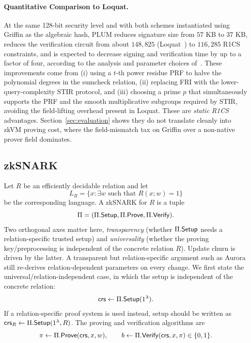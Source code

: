 \paragraph{Quantitative Comparison to Loquat.}
At the same 128-bit security level and with both schemes instantiated using Griffin as the algebraic hash, PLUM reduces signature size from \(57\) KB to \(37\) KB, reduces the verification circuit from about \(148{,}825\) (Loquat~\cite{cryptoeprint:2024/868}) to \(116{,}285\) R1CS constraints, and is expected to decrease signing and verification time by up to a factor of four, according to the analysis and parameter choices of~\cite{10.1007/978-981-95-2961-2_6}.
These improvements come from (i) using a \(t\)-th power residue PRF to halve the polynomial degrees in the sumcheck relation, (ii) replacing FRI with the lower-query-complexity STIR protocol, and (iii) choosing a prime \(p\) that simultaneously supports the PRF and the smooth multiplicative subgroups required by STIR, avoiding the field-lifting overhead present in Loquat. These are \emph{static R1CS} advantages. Section~\ref{sec:evaluation} shows they do not translate cleanly into zkVM proving cost, where the field-mismatch tax on Griffin over a non-native prover field dominates.

\subsection{zkSNARK}
Let $R$ be an efficiently decidable relation and let
\begin{equation*}
  L_R=\{x:\exists w \text{ such that } R(x;w)=1\}
\end{equation*}
be the corresponding language. A zkSNARK for $R$ is a tuple
\begin{equation*}
  \Pi=(\Pi.\mathsf{Setup},\Pi.\mathsf{Prove},\Pi.\mathsf{Verify}).
\end{equation*}
Two orthogonal axes matter here, \emph{transparency} (whether $\Pi.\mathsf{Setup}$ needs a relation-specific trusted setup) and \emph{universality} (whether the proving key/preprocessing is independent of the concrete relation $R$). Update churn is driven by the latter. A transparent but relation-specific argument such as Aurora still re-derives relation-dependent parameters on every change. We first state the universal/relation-independent case, in which the setup is independent of the concrete relation:
\begin{equation*}
  \mathsf{crs}\leftarrow \Pi.\mathsf{Setup}(1^\lambda).
\end{equation*}
If a relation-specific proof system is used instead, setup should be written as $\mathsf{crs}_R\leftarrow\Pi.\mathsf{Setup}(1^\lambda,R)$. The proving and verification algorithms are
\begin{equation*}
  \pi\leftarrow \Pi.\mathsf{Prove}(\mathsf{crs},x,w),
  \qquad
  b\leftarrow \Pi.\mathsf{Verify}(\mathsf{crs},x,\pi)\in\{0,1\}.
\end{equation*}


